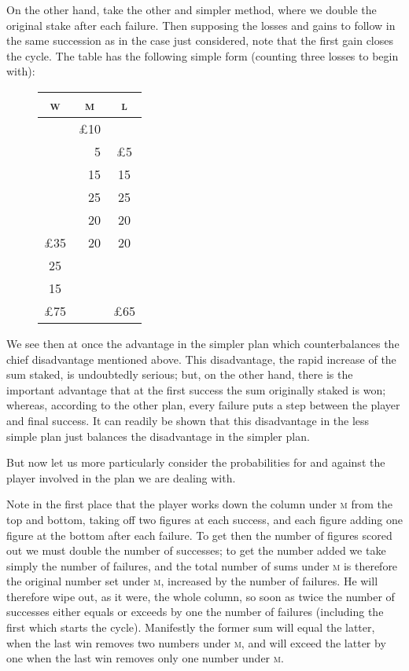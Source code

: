 \documentclass[letterpaper,12pt,oneside,openany]{memoir}
\begin{document}
On the other hand, take the other and simpler
method, where we double the original stake after each
failure. Then supposing the losses
and gains to follow in the same
succession as in the case just considered,
note that the first gain
closes the cycle. The table has
the following simple form (counting
three losses to begin with):

\begin{wrapfigure}[12]{l}{1.4in}
\begin{tabular}{|c|r|c|}
    \hline
    \textsc{w} & \multicolumn{1}{c|}{\textsc{m}} & \textsc{l} \\ \hline
    \, & \pounds 10 & \, \\
    \cline{2-2}
    \, & 5          & \pounds 5 \\
    \, & 15         & 15 \\
    \, & 25         & 25 \\
    \, & 20         & 20 \\
\pounds 35 & 20     & 20 \\
    25 & \,         & \, \\
    15 & \,         & \, \\
    \hline
\pounds 75 & \,     & \pounds 65 \\
    \hline
\end{tabular}
\end{wrapfigure}
We see then at once the advantage
in the simpler plan which
counterbalances the chief disadvantage
mentioned above. This disadvantage, the rapid
increase of the sum staked, is undoubtedly serious;
but, on the other hand, there is the important
advantage that at the first success
the sum originally staked is won;
whereas, according to the other plan,
every failure puts a step between the
player and final success. It can readily
be shown that this disadvantage in the
less simple plan just balances the disadvantage in the
simpler plan.

But now let us more particularly consider the probabilities
for and against the player involved in the
plan we are dealing with.

Note in the first place that the player works down
the column under \textsc{m} from the top and bottom, taking
off two figures at each success, and each figure adding
one figure at the bottom after each failure. To get
then the number of figures scored out we must double
the number of successes; to get the number added we
take simply the number of failures, and the total number
of sums under \textsc{m} is therefore the original number
set under \textsc{m}, increased by the number of failures. He
will therefore wipe out, as it were, the whole column,
so soon as twice the number of successes either equals
or exceeds by one the number of failures (including the
first which starts the cycle). Manifestly the former
sum will equal the latter, when the last win removes
two numbers under \textsc{m}, and will exceed the latter by
one when the last win removes only one number
under \textsc{m}.
\end{document}
